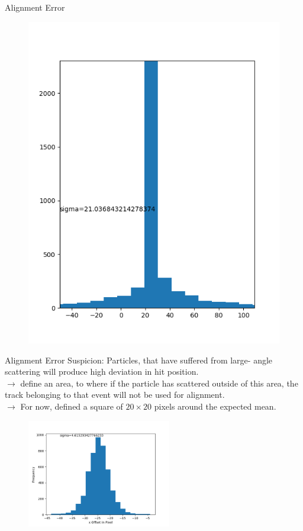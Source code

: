 \documentclass{beamer}
\begin{document}
\begin{frame}[fragile]{Alignment Error}
\begin{minipage}{.49\textwidth}
\begin{figure}[H]
	\includegraphics[trim=0 0 0 50, clip, width=.8\textwidth]{Beforeimasked_zoom.png}
	\end{figure}
    \end{minipage}
\end{frame}

\begin{frame}{Alignment Error}
    \LARGE Suspicion: \normalsize Particles, that have suffered from large-
    angle scattering will produce high deviation in hit position.\\ \pause
    \( \rightarrow \) define an area, to where if the particle has scattered
    outside of this area, the track belonging to that event will not be used
    for alignment.\\
    \( \rightarrow \) For now, defined a square of \( 20 \times 20 \) pixels
    around the expected mean. \pause
    \begin{figure}[H]
	\centering
	\includegraphics[trim=0 0 0 40,clip,width=6.3cm]{Afterimasked.png}
    \end{figure}
\end{frame}
\end{document}
